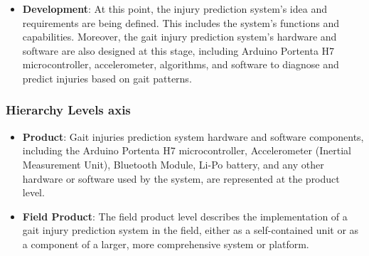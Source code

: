 \begin{itemize}
\item \textbf{Development}: At this point, the injury prediction system's idea and requirements are being defined. This includes the system's functions and capabilities. Moreover, the gait injury prediction system's hardware and software are also designed at this stage, including Arduino Portenta H7 microcontroller, accelerometer, algorithms, and software to diagnose and predict injuries based on gait patterns. 
\end{itemize}

\subsubsection{Hierarchy Levels axis}
\begin{itemize}
\item \textbf{Product}: Gait injuries prediction system hardware and software components, including the Arduino Portenta H7 microcontroller, Accelerometer (Inertial Measurement Unit), Bluetooth Module, Li-Po battery, and any other hardware or software used by the system, are represented at the product level.
\item \textbf{Field Product}: The field product level describes the implementation of a gait injury prediction system in the field, either as a self-contained unit or as a component of a larger, more comprehensive system or platform.
\end{itemize}